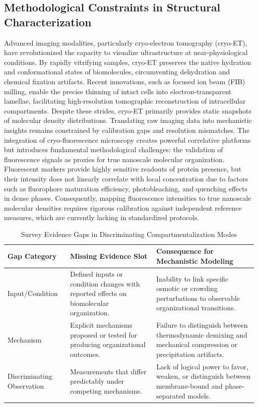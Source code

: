 \documentclass[conference]{IEEEtran}
\begin{document}
\subsection{Methodological Constraints in Structural Characterization}
Advanced imaging modalities, particularly cryo-electron tomography (cryo-ET), have revolutionized the capacity to visualize ultrastructure at near-physiological conditions. By rapidly vitrifying samples, cryo-ET preserves the native hydration and conformational states of biomolecules, circumventing dehydration and chemical fixation artifacts. Recent innovations, such as focused ion beam (FIB) milling, enable the precise thinning of intact cells into electron-transparent lamellae, facilitating high-resolution tomographic reconstruction of intracellular compartments. Despite these strides, cryo-ET primarily provides static snapshots of molecular density distributions. Translating raw imaging data into mechanistic insights remains constrained by calibration gaps and resolution mismatches. The integration of cryo-fluorescence microscopy creates powerful correlative platforms but introduces fundamental methodological challenges: the validation of fluorescence signals as proxies for true nanoscale molecular organization. Fluorescent markers provide highly sensitive readouts of protein presence, but their intensity does not linearly correlate with local concentration due to factors such as fluorophore maturation efficiency, photobleaching, and quenching effects in dense phases. Consequently, mapping fluorescence intensities to true nanoscale molecular densities requires rigorous calibration against independent reference measures, which are currently lacking in standardized protocols.~\cite{cite_9ae4c49700eea560,cite_c2d09a021a2238e3}

\begin{table}[htbp]
\centering
\footnotesize
\setlength{\tabcolsep}{3pt}
\renewcommand{\arraystretch}{1.12}
\caption{Survey Evidence Gaps in Discriminating Compartmentalization Modes}
\label{tab:survey-and-research-gap-block-4}
\begin{tabular}{|p{}|p{}|p{}|}
\hline
Gap Category & Missing Evidence Slot & Consequence for Mechanistic Modeling \\\hline
Input/Condition & Defined inputs or condition changes with reported effects on biomolecular organization. & Inability to link specific osmotic or crowding perturbations to observable organizational transitions. \\\hline
Mechanism & Explicit mechanisms proposed or tested for producing organizational outcomes. & Failure to distinguish between thermodynamic demixing and mechanical compression or precipitation artifacts. \\\hline
Discriminating Observation & Measurements that differ predictably under competing mechanisms. & Lack of logical power to favor, weaken, or distinguish between membrane-bound and phase-separated models. \\\hline
\end{tabular}
\end{table}
\end{document}
